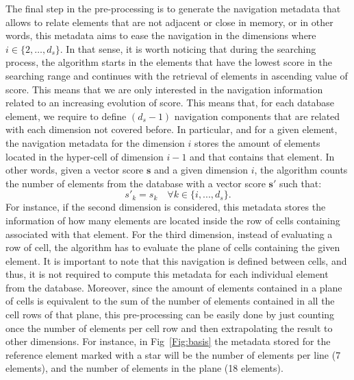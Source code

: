 \documentclass[review]{elsarticle}
\begin{document}
The final step in the pre-processing is to generate the navigation metadata that allows to relate elements that are not adjacent or close in memory, or in other words, this metadata aims to ease the navigation in the dimensions where $i\in\{2,\dots,d_s\}$. In that sense, it is worth noticing that during the searching process, the algorithm starts in the elements that have the lowest score in the searching range and continues with the retrieval of elements in ascending value of score. This means that we are only interested in the navigation information related to an increasing evolution of score. This means that, for each database element, we require to define $(d_s-1)$ navigation components that are related with each dimension not covered before. In particular, and for a given element, the navigation metadata for the dimension $i$ stores the amount of elements located in the hyper-cell of dimension $i-1$ and that contains that element. In other words, given a vector score $\mathbf{s}$ and a given dimension $i$, the algorithm counts the number of elements from the database with a vector score $\mathbf{s'}$ such that:
\begin{equation}\label{eq:navscore}
s'_k = s_k \quad \forall  k \in\{i,...,d_s\}.
\end{equation}
For instance, if the second dimension is considered, this metadata stores the information of how many elements are located inside the row of cells containing associated with that element. For the third dimension, instead of evaluating a row of cell, the algorithm has to evaluate the plane of cells containing the given element. It is important to note that this navigation is defined between cells, and thus, it is not required to compute this metadata for each individual element from the database. Moreover, since the amount of elements contained in a plane of cells is equivalent to the sum of the number of elements contained in all the cell rows of that plane, this pre-processing can be easily done by just counting once the number of elements per cell row and then extrapolating the result to other dimensions. For instance, in Fig~\ref{Fig:basis} the metadata stored for the reference element marked with a star will be the number of elements per line (7 elements), and the number of elements in the plane (18 elements).
\end{document}
